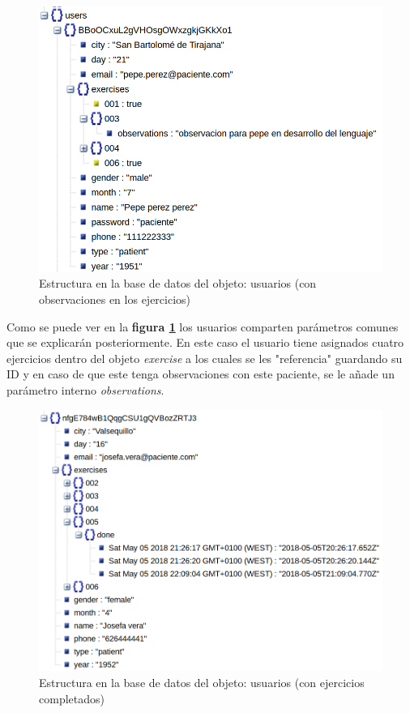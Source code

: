 \medskip
\begin{figure}
    \includegraphics[width=\linewidth]{./images/users-patient-with-observations-database.png}
    \caption{Estructura en la base de datos del objeto: usuarios (con observaciones en los ejercicios)}
    \label{usuario-con-observaciones}
\end{figure}

Como se puede ver en la \textbf{figura \ref{usuario-con-observaciones}}
los usuarios comparten parámetros comunes que se explicarán posteriormente.
En este caso el usuario tiene asignados cuatro ejercicios dentro del objeto
\textit{exercise} a los cuales se les "referencia" guardando su ID y en caso
de que este tenga observaciones con este paciente, se le añade un parámetro
interno \textit{observations}.


\medskip
\begin{figure}
    \includegraphics[width=\linewidth]{./images/users-patient-with-exercises-done-database.png}
    \caption{Estructura en la base de datos del objeto: usuarios (con ejercicios completados)}
    \label{usuario-con-ejercicios}
\end{figure}

